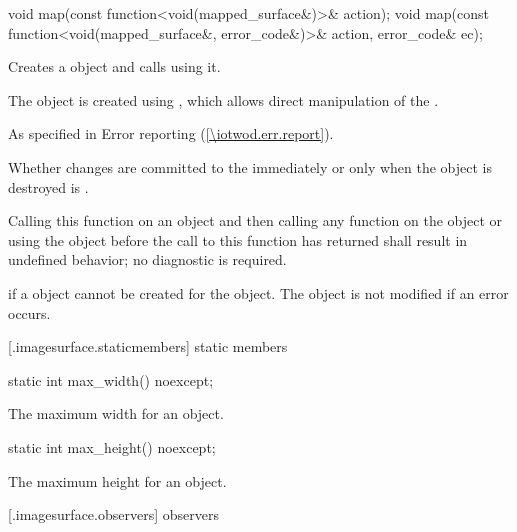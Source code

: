 %
\begin{itemdecl}
void map(const function<void(mapped_surface&)>& action);
void map(const function<void(mapped_surface&, error_code&)>& action, error_code& ec);
\end{itemdecl}
\begin{itemdescr}
\pnum
\effects
Creates a  object and calls  using it.

\pnum
The  object is created using , which allows direct manipulation of the \underlyingsurface.
	
\pnum
\throws
As specified in Error reporting (\ref{\iotwod.err.report}).
	
\pnum
\remarks
Whether changes are committed to the \underlyingsurface immediately or only when the  object is destroyed is \unspecnorm.
	
\pnum
Calling this function on an  object and then calling any function on the  object or using the  object before the call to this function has returned shall result in undefined behavior; no diagnostic is required.
	
\pnum
\errors
{} if a  object cannot be created for the  object. The  object is not modified if an error occurs.
\end{itemdescr}

 [\iotwod.imagesurface.staticmembers] { static members}

%
\begin{itemdecl}
static int max_width() noexcept;
\end{itemdecl}
\begin{itemdescr}
\pnum
\returns
The maximum width for an  object.
\end{itemdescr}

%
\begin{itemdecl}
static int max_height() noexcept;
\end{itemdecl}
\begin{itemdescr}
\pnum
\returns
The maximum height for an  object.
\end{itemdescr}
    

 [\iotwod.imagesurface.observers] { observers}

